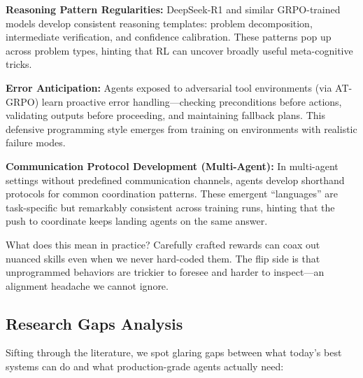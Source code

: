 \documentclass[12pt,a4paper]{report}
\theoremstyle{definition}
\begin{document}
\textbf{Reasoning Pattern Regularities:} DeepSeek-R1 and similar GRPO-trained models develop consistent reasoning templates: problem decomposition, intermediate verification, and confidence calibration. These patterns pop up across problem types, hinting that RL can uncover broadly useful meta-cognitive tricks.

\textbf{Error Anticipation:} Agents exposed to adversarial tool environments (via AT-GRPO) learn proactive error handling---checking preconditions before actions, validating outputs before proceeding, and maintaining fallback plans. This defensive programming style emerges from training on environments with realistic failure modes.

\textbf{Communication Protocol Development (Multi-Agent):} In multi-agent settings without predefined communication channels, agents develop shorthand protocols for common coordination patterns. These emergent ``languages'' are task-specific but remarkably consistent across training runs, hinting that the push to coordinate keeps landing agents on the same answer.

What does this mean in practice? Carefully crafted rewards can coax out nuanced skills even when we never hard-coded them. The flip side is that unprogrammed behaviors are trickier to foresee and harder to inspect---an alignment headache we cannot ignore.

\subsection{Research Gaps Analysis}

Sifting through the literature, we spot glaring gaps between what today's best systems can do and what production-grade agents actually need:
\end{document}
